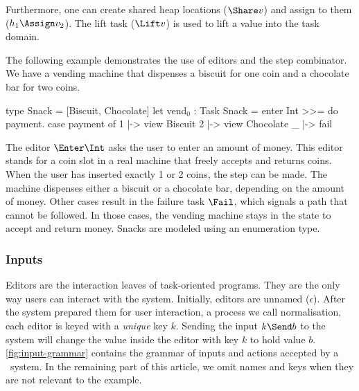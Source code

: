 Furthermore, one can create shared heap locations ($\Share v$) and assign to them ($h_1 \Assign v_2$).
The lift task ($\Lift v$) is used to lift a value into the task domain.

\begin{example}
  \label{exm:vending-base}
  The following example demonstrates the use of editors and the step combinator.
  We have a vending machine that dispenses a biscuit for one coin and a chocolate bar for two coins.
  \begin{TASK}[emph={payment}]
    type Snack = [Biscuit, Chocolate]
    let vend$_0$ : Task Snack = enter Int >>= do payment.
      case payment of
        1 |-> view Biscuit
        2 |-> view Chocolate
        _ |-> fail
  \end{TASK}
  The editor $\Enter \Int$ asks the user to enter an amount of money.
  This editor stands for a coin slot in a real machine that freely accepts and returns coins.
  When the user has inserted exactly 1 or 2 coins, the step can be made.
  The machine dispenses either a biscuit or a chocolate bar, depending on the amount of money.
  Other cases result in the failure task $\Fail$, which signals a path that cannot be followed.
  In those cases, the vending machine stays in the state to accept and return money.
  Snacks are modeled using an enumeration type.
\end{example}


\subsubsection{Inputs}
\label{sub:inputs}

Editors are the interaction leaves of task-oriented programs.
They are the only way users can interact with the system.
Initially, editors are unnamed ($\epsilon$).
After the system prepared them for user interaction, a process we call normalisation,
each editor is keyed with a \emph{unique} key $k$.
Sending the input $k \Send b$ to the system will change the value inside the editor with key $k$ to hold value $b$.
\cref{fig:input-grammar} contains the grammar of inputs and actions accepted by a \TOPHAT\ system.
In the remaining part of this article,
we omit names and keys when they are not relevant to the example.

